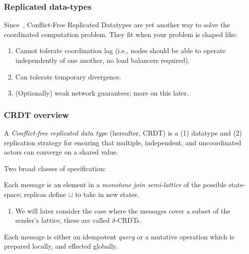 \documentclass[aspectratio=169,compress]{beamer}
\begin{document}
  \begin{frame}
    \frametitle{Replicated data-types}

    Since~\cite{shapiro11}, Conflict-Free Replicated Datatypes are yet another
    way to solve the coordinated computation problem. They fit when your problem
    is shaped like:
    \begin{enumerate}[<+->]
      \item Cannot tolerate coordination lag (i.e., nodes should be able to
        operate independently of one another, no load balancers required).
      \item Can tolerate temporary divergence.
      \item (Optionally) weak network guarantees; more on this later.
    \end{enumerate}
  \end{frame}

  \begin{frame}
    \frametitle{CRDT overview}

    A \textit{Conflict-free replicated data type} (hereafter, CRDT) is a (1)
    datatype and (2) replication strategy for ensuring that multiple,
    independent, and uncoordinated actors can converge on a shared value.

    \vspace{1em}

    Two broad classes of specification:
    \begin{description}[<+->]
      \item[State-based] Each message is an element in a \textit{monotone join
        semi-lattice} of the possible state-space; replicas define $\sqcup$ to
        take in new states.
        \begin{enumerate}
          \item We will later consider the case where the messages cover a
            subset of the sender's lattice, these are called $\delta$-CRDTs.
        \end{enumerate}
      \item[Op-based] Each message is either an idempotent \textit{query} or a
        mutative operation which is prepared locally, and effected globally.
    \end{description}
  \end{frame}
\end{document}
